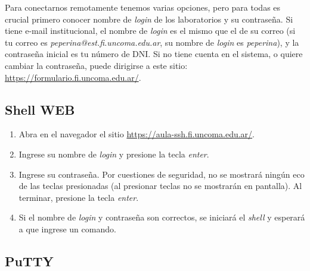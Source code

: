 \documentclass[12pt]{article}
\begin{document}
Para conectarnos remotamente tenemos varias opciones, pero para todas es
crucial primero conocer nombre de \emph{login} de los laboratorios y su
contraseña. Si tiene e-mail institucional, el nombre de \emph{login} es el
mismo que el de su correo (si tu correo es
\emph{peperina@est.fi.uncoma.edu.ar}, su nombre de \emph{login} es
\emph{peperina}), y la contraseña inicial es tu número de DNI. Si no tiene
cuenta en el sistema, o quiere cambiar la contraseña, puede dirigirse a este
sitio: \url{https://formulario.fi.uncoma.edu.ar/}.

\subsection*{Shell WEB}

\begin{enumerate}
    \item Abra en el navegador el sitio
        \url{https://aula-ssh.fi.uncoma.edu.ar/}.

    \item Ingrese su nombre de \emph{login} y presione la tecla \emph{enter}.

    \item Ingrese su contraseña. Por cuestiones de seguridad, no se mostrará
        ningún eco de las teclas presionadas (al presionar teclas no se
        mostrarán en pantalla). Al terminar, presione la tecla 
        \emph{enter}.

    \item Si el nombre de \emph{login} y contraseña son correctos, se iniciará el
        \emph{shell} y esperará a que ingrese un comando.

\end{enumerate}

\subsection*{PuTTY}
\end{document}
